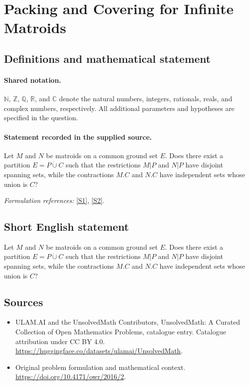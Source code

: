 \documentclass[11pt]{article}
\newcommand{\sref}[2]{\hyperlink{source:#1:#2}{[S#2]}}
\begin{document}
\section{Packing and Covering for Infinite Matroids}\label{statement}

\subsection{Definitions and mathematical statement}

\paragraph{Shared notation.}$\mathbb N$, $\mathbb Z$, $\mathbb Q$, $\mathbb R$, and $\mathbb C$ denote the natural numbers, integers, rationals, reals, and complex numbers, respectively. All additional parameters and hypotheses are specified in the question.


\paragraph{Statement recorded in the supplied source.}
Let $M$ and $N$ be matroids on a common ground set $E$. Does there exist a partition $E=P\mathbin{\dot\cup}C$ such that the restrictions $M|P$ and $N|P$ have disjoint spanning sets, while the contractions $M.C$ and $N.C$ have independent sets whose union is $C$?
\par\smallskip\textit{Formulation references:} \sref{statement}{1}, \sref{statement}{2}.
\subsection{Short English statement}
Let $M$ and $N$ be matroids on a common ground set $E$. Does there exist a partition $E=P\mathbin{\dot\cup}C$ such that the restrictions $M|P$ and $N|P$ have disjoint spanning sets, while the contractions $M.C$ and $N.C$ have independent sets whose union is $C$?
\subsection{Sources}
\begin{itemize}
\item[\hypertarget{source:statement:1}{S1}] ULAM.AI and the UnsolvedMath Contributors, UnsolvedMath: A Curated Collection of Open Mathematics Problems, catalogue entry. Catalogue attribution under CC BY 4.0.
\url{https://huggingface.co/datasets/ulamai/UnsolvedMath}.
\item[\hypertarget{source:statement:2}{S2}] Original problem formulation and mathematical context.
\url{https://doi.org/10.4171/owr/2016/2}.
\end{itemize}
\label{end:statement}
\end{document}

